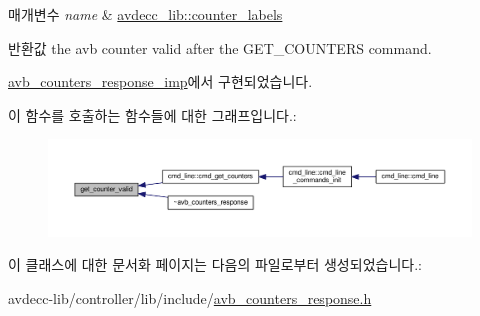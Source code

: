 \begin{DoxyParams}{매개변수}
{\em name} & \hyperlink{namespaceavdecc__lib_a831be56dba8ac423258a9374a1202df4}{avdecc\+\_\+lib\+::counter\+\_\+labels}\\
\hline
\end{DoxyParams}
\begin{DoxyReturn}{반환값}
the avb counter valid after the G\+E\+T\+\_\+\+C\+O\+U\+N\+T\+E\+RS command. 
\end{DoxyReturn}


\hyperlink{classavdecc__lib_1_1avb__counters__response__imp_a192c298bbf4dbeef7d3d88d892732455}{avb\+\_\+counters\+\_\+response\+\_\+imp}에서 구현되었습니다.



이 함수를 호출하는 함수들에 대한 그래프입니다.\+:
\nopagebreak
\begin{figure}[H]
\begin{center}
\leavevmode
\includegraphics[width=350pt]{classavdecc__lib_1_1avb__counters__response_a1a714d004a3ca8b521311ba4d3e62e93_icgraph}
\end{center}
\end{figure}




이 클래스에 대한 문서화 페이지는 다음의 파일로부터 생성되었습니다.\+:\begin{DoxyCompactItemize}
\item 
avdecc-\/lib/controller/lib/include/\hyperlink{avb__counters__response_8h}{avb\+\_\+counters\+\_\+response.\+h}\end{DoxyCompactItemize}
